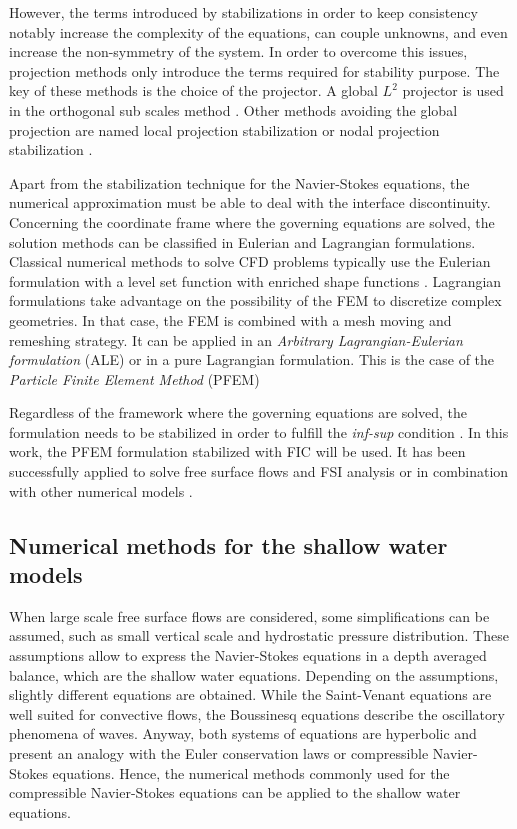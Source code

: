 However, the terms introduced by stabilizations in order to keep consistency notably increase the complexity of the equations, can couple unknowns, and even increase the non-symmetry of the system. In order to overcome this issues, projection methods only introduce the terms required for stability purpose. The key of these methods is the choice of the projector. A global $L^2$ projector is used in the orthogonal sub scales method \cite{codina2000}. Other methods avoiding the global projection are named local projection stabilization \cite{braack2006,matthies2007} or nodal projection stabilization \cite{badia2012}.


Apart from the stabilization technique for the Navier-Stokes equations, the numerical approximation must be able to deal with the interface discontinuity. Concerning the coordinate frame where the governing equations are solved, the solution methods can be classified in Eulerian and Lagrangian formulations. Classical numerical methods to solve CFD problems typically use the Eulerian formulation with a level set function \cite{chen1997} with enriched shape functions \cite{burman2015cut}. Lagrangian formulations take advantage on the possibility of the FEM to discretize complex geometries. In that case, the FEM is combined with a mesh moving and remeshing strategy. It can be applied in an \emph{Arbitrary Lagrangian-Eulerian formulation} (ALE) \cite{donea2004} or in a pure Lagrangian formulation. This is the case of the \emph{Particle Finite Element Method} (PFEM) \cite{onate2004,idelsohn2004}

Regardless of the framework where the governing equations are solved, the formulation needs to be stabilized in order to fulfill the \emph{inf-sup} condition \cite{brezzi1991}. In this work, the PFEM formulation stabilized with FIC will be used. It has been successfully applied to solve free surface flows \cite{delpin2007} and FSI analysis \cite{onate2008} or in combination with other numerical models \cite{onate2022}.


\subsection{Numerical methods for the shallow water models}


When large scale free surface flows are considered, some simplifications can be assumed, such as small vertical scale and hydrostatic pressure distribution. These assumptions allow to express the Navier-Stokes equations in a depth averaged balance, which are the shallow water equations. Depending on the assumptions, slightly different equations are obtained. While the Saint-Venant equations are well suited for convective flows, the Boussinesq equations describe the oscillatory phenomena of waves. Anyway, both systems of equations are hyperbolic and present an analogy with the Euler conservation laws or compressible Navier-Stokes equations. Hence, the numerical methods commonly used for the compressible Navier-Stokes equations can be applied to the shallow water equations.


